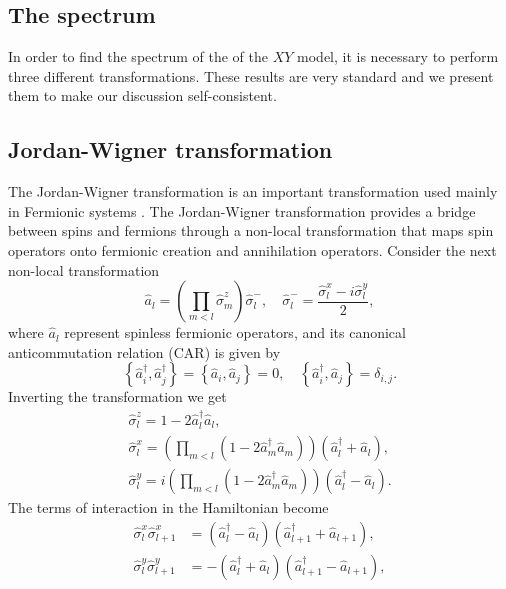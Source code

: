 \subsection{The spectrum}
In order to find the spectrum of the of the $XY$ model, it is necessary to perform three different transformations. These results are very standard and we present them to make our discussion self-consistent.
\subsection{Jordan-Wigner transformation}
The Jordan-Wigner transformation is an important transformation used mainly in Fermionic systems  \cite{Michael_nielsen_2005}. The Jordan-Wigner transformation provides a bridge between spins and fermions through a non-local transformation that maps spin operators onto fermionic creation and annihilation operators. Consider the next non-local transformation
\begin{equation}
\hat{a}_{l}=\left(\prod_{m<l} \hat{\sigma}_{m}^{z}\right) \hat{\sigma}_{l}^{-}, \quad \hat{\sigma}_{l}^{-}=\frac{\hat{\sigma}_{l}^{x}-i \hat{\sigma}_{l}^{y}}{2},
\end{equation}
where $\hat{a}_l$ represent spinless fermionic operators, and its canonical anticommutation relation (CAR) is given by\cite{reyes-lega_aspects_2016} 
\begin{equation}
\left\{\hat{a}_{i}^{\dagger}, \hat{a}_{j}^{\dagger}\right\}=\left\{\hat{a}_{i}, \hat{a}_{j}\right\}=0, \quad\left\{\hat{a}_{i}^{\dagger}, \hat{a}_{j}\right\}=\delta_{i, j}.
\end{equation}
Inverting the transformation we get 
\begin{equation}
\begin{array}{l}
\hat{\sigma}_{l}^{z}=1-2 \hat{a}_{l}^{\dagger} \hat{a}_{l}, \\
\hat{\sigma}_{l}^{x}=\left(\prod_{m<l}\left(1-2 \hat{a}_{m}^{\dagger} \hat{a}_{m}\right)\right)\left(\hat{a}_{l}^{\dagger}+\hat{a}_{l}\right), \\
\hat{\sigma}_{l}^{y}=i\left(\prod_{m<l}\left(1-2 \hat{a}_{m}^{\dagger} \hat{a}_{m}\right)\right)\left(\hat{a}_{l}^{\dagger}-\hat{a}_{l}\right).
\end{array}
\end{equation}
The terms of interaction in the Hamiltonian become
\begin{equation}
\begin{aligned}
\hat{\sigma}_{l}^{x} \hat{\sigma}_{l+1}^{x} &=\left(\hat{a}_{l}^{\dagger}-\hat{a}_{l}\right)\left(\hat{a}_{l+1}^{\dagger}+\hat{a}_{l+1}\right), \\
\hat{\sigma}_{l}^{y} \hat{\sigma}_{l+1}^{y} &=-\left(\hat{a}_{l}^{\dagger}+\hat{a}_{l}\right)\left(\hat{a}_{l+1}^{\dagger}-\hat{a}_{l+1}\right),
\end{aligned}
\end{equation}
